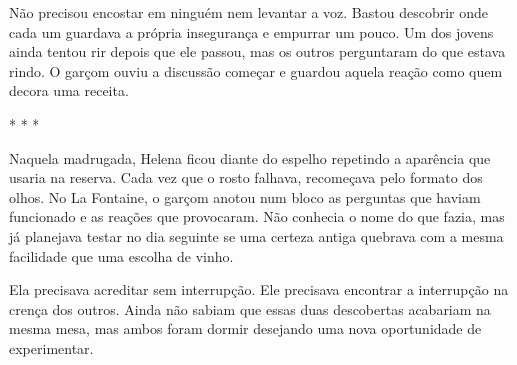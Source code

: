Não precisou encostar em ninguém nem levantar a voz. Bastou descobrir onde cada um guardava a própria insegurança e empurrar um pouco. Um dos jovens ainda tentou rir depois que ele passou, mas os outros perguntaram do que estava rindo. O garçom ouviu a discussão começar e guardou aquela reação como quem decora uma receita.

\begin{center}
* * *
\end{center}

Naquela madrugada, Helena ficou diante do espelho repetindo a aparência que usaria na reserva. Cada vez que o rosto falhava, recomeçava pelo formato dos olhos. No La Fontaine, o garçom anotou num bloco as perguntas que haviam funcionado e as reações que provocaram. Não conhecia o nome do que fazia, mas já planejava testar no dia seguinte se uma certeza antiga quebrava com a mesma facilidade que uma escolha de vinho.

Ela precisava acreditar sem interrupção. Ele precisava encontrar a interrupção na crença dos outros. Ainda não sabiam que essas duas descobertas acabariam na mesma mesa, mas ambos foram dormir desejando uma nova oportunidade de experimentar.
